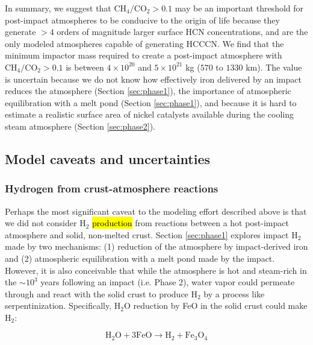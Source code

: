 In summary, we suggest that $\mathrm{CH_4}/\mathrm{CO_2} > 0.1$ may be an important threshold for post-impact atmospheres to be conducive to the origin of life because they generate $> 4$ orders of magnitude larger surface HCN concentrations, and are the only modeled atmospheres capable of generating HCCCN. We find that the minimum impactor mass required to create a post-impact atmosphere with $\mathrm{CH_4}/\mathrm{CO_2} > 0.1$ is between $4 \times 10^{20}$ and $5 \times 10^{21}$ kg  ($570$ to $1330$ km). The value is uncertain because we do not know how effectively iron delivered by an impact reduces the atmosphere (Section \ref{sec:phase1}), the importance of atmospheric equilibration with a melt pond (Section \ref{sec:phase1}), and because it is hard to estimate a realistic surface area of nickel catalysts available during the cooling steam atmosphere (Section \ref{sec:phase2}).

\subsection{Model caveats and uncertainties}

\subsubsection{Hydrogen from crust-atmosphere reactions}

Perhaps the most significant caveat to the modeling effort described above is that we did not consider H$_2$ \hl{production} from reactions between a hot post-impact atmosphere and solid, non-melted crust. Section \ref{sec:phase1} explores impact H$_2$ made by two mechanisms: (1) reduction of the atmosphere by impact-derived iron and (2) atmospheric equilibration with a melt pond made by the impact. However, it is also conceivable that while the atmosphere is hot and  steam-rich in the $\sim 10^3$ years following an impact (i.e. Phase 2), water vapor could permeate through and react with the solid crust to produce H$_2$ by a process like serpentinization. Specifically, H$_2$O reduction by FeO in the solid crust could make H$_2$: 

\begin{equation} \label{eq:serp}
  \mathrm{H_2O} + 3 \mathrm{FeO} \rightarrow \mathrm{H_2} + \mathrm{Fe_3O_4}
\end{equation}


